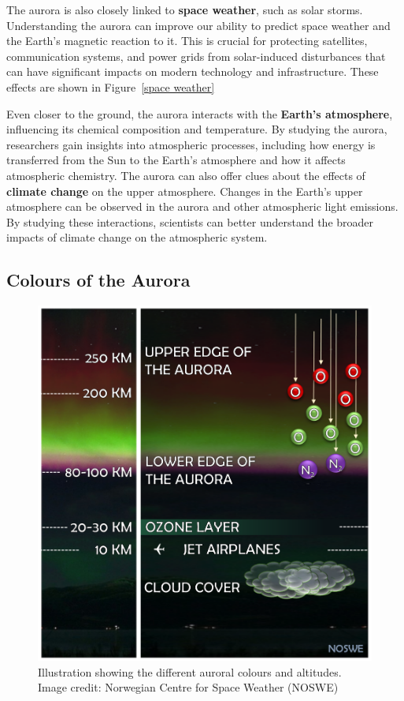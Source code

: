 \documentclass{article}
\begin{document}
The aurora is also closely linked to \textbf{space weather}, such as solar storms. Understanding the aurora can improve our ability to predict space weather and the Earth's magnetic reaction to it. This is crucial for protecting satellites, communication systems, and power grids from solar-induced disturbances that can have significant impacts on modern technology and infrastructure. These effects are shown in Figure~\ref{space weather}

Even closer to the ground, the aurora interacts with the \textbf{Earth's atmosphere}, influencing its chemical composition and temperature. By studying the aurora, researchers gain insights into atmospheric processes, including how energy is transferred from the Sun to the Earth's atmosphere and how it affects atmospheric chemistry. The aurora can also offer clues about the effects of \textbf{climate change} on the upper atmosphere. Changes in the Earth's upper atmosphere can be observed in the aurora and other atmospheric light emissions. By studying these interactions, scientists can better understand the broader impacts of climate change on the atmospheric system.




\subsection{Colours of the Aurora}


\begin{figure}[h!]
  \includegraphics[width=\linewidth]{Fig3_Colours.png}
  \caption{Illustration showing the different auroral colours and altitudes. Image credit: Norwegian Centre for Space Weather (NOSWE) }
  \label{colours}
  
\end{figure}
\end{document}
